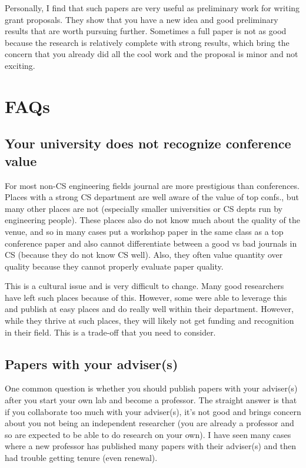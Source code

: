 \documentclass[oneside,11pt,dvipsnames]{book}
\begin{document}
Personally, I find that such papers are very useful as preliminary work for writing grant proposals. They show that you have a new idea and good preliminary results that are worth pursuing further. Sometimes a full paper is not as good because the research is relatively complete with strong results, which bring the concern that you already did all the cool work and the proposal is minor and not exciting.





\section{FAQs}



\subsection{Your university does not recognize conference value} For most non-CS engineering fields journal are more prestigious than conferences. Places with a strong CS department are well aware of the value of top confs., but many other places are not (especially smaller universities or CS depts run by engineering people). These places also do not know much about the quality of the venue, and so in many cases put a workshop paper in the same class as a top conference paper and also cannot differentiate between a good vs bad journals in CS (because they do not know CS well). Also,  they often value quantity over quality because they cannot properly evaluate paper quality.

This is a cultural issue and is very difficult to change. Many good researchers have left such places because of this.  However, some were able to leverage this and publish at easy places and do really well within their department.  However, while they thrive at such places, they will likely not get funding and recognition in their field.  This is a trade-off that you need to consider.


\subsection{Papers with your adviser(s)}
One common question is whether you should publish papers with your adviser(s) after you start your own lab and become a professor.  The straight answer is that if you collaborate too much with your adviser(s), it's not good and brings concern about you not being an independent researcher (you are already a professor and so are expected to be able to do research on your own). I have seen many cases where a new professor has published many papers with their adviser(s) and then had trouble getting tenure (even renewal).
\end{document}

